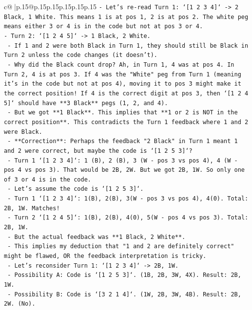 \documentclass{article}
\begin{document}
{\begin{supertabular}{c@{$\;$}|p{.15\linewidth}@{}p{.15\linewidth}p{.15\linewidth}p{.15\linewidth}p{.15\linewidth}p{.15\linewidth}}
{{{\texttt{{-} Let's re{-}read Turn 1: `{[}1 2 3 4{]}` {-}> 2 Black, 1 White. This means 1 is at pos 1, 2 is at pos 2. The white peg means either 3 or 4 is in the code but not at pos 3 or 4.} \\
\texttt{{-} Turn 2: `{[}1 2 4 5{]}` {-}> 1 Black, 2 White.} \\
\texttt{    {-} If 1 and 2 were both Black in Turn 1, they should still be Black in Turn 2 unless the code changes (it doesn't).} \\
\texttt{    {-} Why did the Black count drop? Ah, in Turn 1, 4 was at pos 4. In Turn 2, 4 is at pos 3. If 4 was the "White" peg from Turn 1 (meaning it's in the code but not at pos 4), moving it to pos 3 might make it the correct position! If 4 is the correct digit at pos 3, then `{[}1 2 4 5{]}` should have **3 Black** pegs (1, 2, and 4).} \\
\texttt{    {-} But we got **1 Black**. This implies that **1 or 2 is NOT in the correct position**. This contradicts the Turn 1 feedback where 1 and 2 were Black.} \\
\texttt{    {-} **Correction**: Perhaps the feedback "2 Black" in Turn 1 meant 1 and 2 were correct, but maybe the code is `{[}1 2 5 3{]}`?} \\
\texttt{        {-} Turn 1 `{[}1 2 3 4{]}`: 1 (B), 2 (B), 3 (W {-} pos 3 vs pos 4), 4 (W {-} pos 4 vs pos 3). That would be 2B, 2W. But we got 2B, 1W. So only one of 3 or 4 is in the code.} \\
\texttt{        {-} Let's assume the code is `{[}1 2 5 3{]}`.} \\
\texttt{            {-} Turn 1 `{[}1 2 3 4{]}`: 1(B), 2(B), 3(W {-} pos 3 vs pos 4), 4(0). Total: 2B, 1W. Matches!} \\
\texttt{            {-} Turn 2 `{[}1 2 4 5{]}`: 1(B), 2(B), 4(0), 5(W {-} pos 4 vs pos 3). Total: 2B, 1W.} \\
\texttt{            {-} But the actual feedback was **1 Black, 2 White**.} \\
\texttt{    {-} This implies my deduction that "1 and 2 are definitely correct" might be flawed, OR the feedback interpretation is tricky.} \\
\texttt{    {-} Let's reconsider Turn 1: `{[}1 2 3 4{]}` {-}> 2B, 1W.} \\
\texttt{        {-} Possibility A: Code is `{[}1 2 5 3{]}`. (1B, 2B, 3W, 4X). Result: 2B, 1W.} \\
\texttt{        {-} Possibility B: Code is `{[}3 2 1 4{]}`. (1W, 2B, 3W, 4B). Result: 2B, 2W. (No).} \\
}}}
\end{supertabular}}
\end{document}
